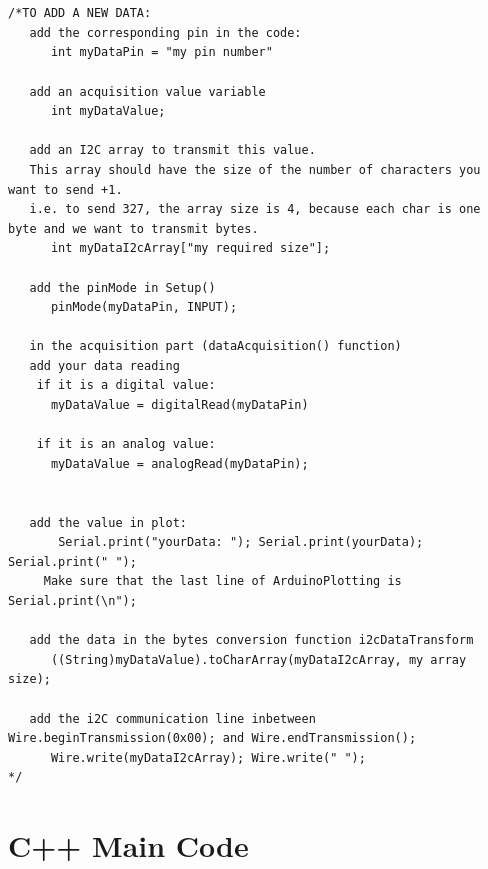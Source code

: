 \documentclass[a4paper]{article}
\begin{document}
\begin{lstlisting}


/*TO ADD A NEW DATA:
   add the corresponding pin in the code:
      int myDataPin = "my pin number"

   add an acquisition value variable
      int myDataValue;

   add an I2C array to transmit this value.
   This array should have the size of the number of characters you want to send +1.
   i.e. to send 327, the array size is 4, because each char is one byte and we want to transmit bytes.
      int myDataI2cArray["my required size"];

   add the pinMode in Setup()
      pinMode(myDataPin, INPUT);

   in the acquisition part (dataAcquisition() function)
   add your data reading
    if it is a digital value:
      myDataValue = digitalRead(myDataPin)

    if it is an analog value:
      myDataValue = analogRead(myDataPin);


   add the value in plot:
       Serial.print("yourData: "); Serial.print(yourData); Serial.print(" ");
     Make sure that the last line of ArduinoPlotting is Serial.print(\n");

   add the data in the bytes conversion function i2cDataTransform
      ((String)myDataValue).toCharArray(myDataI2cArray, my array size);

   add the i2C communication line inbetween Wire.beginTransmission(0x00); and Wire.endTransmission();
      Wire.write(myDataI2cArray); Wire.write(" ");
*/
\end{lstlisting}


\newpage

\appendix

\section{C++ Main Code}
\label{code}











\end{document}
